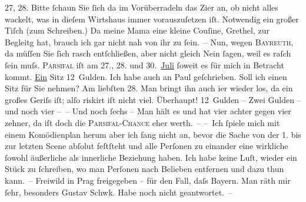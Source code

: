 \begin{ledgroupsized}[t]{13cm}
                  27, 28. Bitte ſchaun Sie ſich da{\geminationn} im Vorüberradeln das Zi{\geminationm}er an, ob nicht alles wackelt, was in dieſem Wirtshaus {\pb}immer vorauszuſetzen iſt. Notwendig ein großer Tiſch
               (zum Schreiben.) Da meine Mama eine kleine Couſine, Grethel,
               zur Begleitg hat, brauch ich gar nicht nah von ihr zu ſein. –\pend
           \pstart
           Nun, wegen \textsc{Bayreuth}, da müſſen Sie ſich rasch {\pb}entſchließen, aber
               nicht gleich Nein ſagen, weil es raſch ſein muſs. \textsc{Parsifal} iſt am 27., 28. und 30. \uline{Juli}{ }ſoweit es für mich in Betracht kommt. \uline{Ein}{ }Sitz 12 Gulden. Ich habe auch an Paul geſchrieben. Soll ich ei{\pb}nen Sitz für Sie nehmen? Am liebſten 28.
               Man bringt ihn auch i{\geminationm}er wieder los, da ein großes
               Geriſs iſt; alſo riskirt iſt nicht viel. Überhaupt! 12 Gulden – Zwei Gulden – und
               noch vier – – Und noch ſechs – Man {\pb}hält es und hat
               vier achter gegen vier zehner, da iſt doch die \textsc{Parsifal-Chance} eher werth. –\pend
           \pstart
           – Ich ſpiele mich mit einem Komödienplan herum {\dotsfour} aber ich fang nicht an,
               bevor die Sache von der 1. bis zur letzten Scene abſolut feſtſteht und alle {\pb}Perſonen zu einander eine wirkliche ſowohl äußerliche
               als innerliche Beziehung haben. Ich habe keine Luſt, wieder ein Stück zu ſchreiben,
               wo man Perſonen nach Belieben entfernen und dazu thun kann. – Freiwild in Prag frei{\pb}gegeben – für den Fall, daſs Bayern. Man räth mir ſehr, besonders Gustav Schwk. Habe noch nicht geantwortet. –\pend

\end{ledgroupsized}

